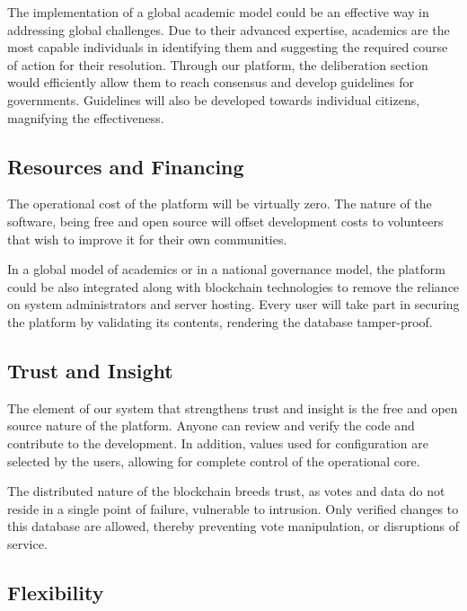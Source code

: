 \documentclass[a4paper,11pt]{article}
\begin{document}
\begin{multicols}{2}
The implementation of a global academic model could be an effective way in addressing global challenges. Due to their advanced expertise, academics are the most capable individuals in identifying them and suggesting the required course of action for their resolution. Through our platform, the deliberation section would efficiently allow them to reach consensus and develop guidelines for governments. Guidelines will also be developed towards individual citizens, magnifying the effectiveness.

\subsection{Resources and Financing} \label{resources}

The operational cost of the platform will be virtually zero. The nature of the software, being free and open source will offset development costs to volunteers that wish to improve it for their own communities.

In a global model of academics or in a national governance model, the platform could be also integrated along with blockchain technologies to remove the reliance on system administrators and server hosting. Every user will take part in securing the platform by validating its contents, rendering the database tamper-proof.

\subsection{Trust and Insight} \label{trust}

The element of our system that strengthens trust and insight is the free and open source nature of the platform. Anyone can review and verify the code and contribute to the development. In addition, values used for configuration are selected by the users, allowing for complete control of the operational core.

The distributed nature of the blockchain breeds trust, as votes and data do not reside in a single point of failure, vulnerable to intrusion. Only verified changes to this database are allowed, thereby preventing vote manipulation, or disruptions of service.

\subsection{Flexibility} \label{flexibility}

\begin{figure}[hb]
\centering
\resizebox{45mm}{!}{}
\label{TDFlogo}
\end{figure}


\end{multicols}
\end{document}
